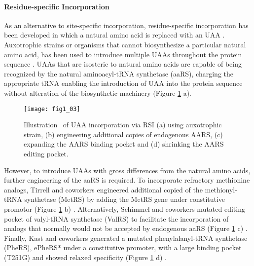 \begin{refsection}
\paragraph{ Residue-specific Incorporation}
As an alternative to site-specific incorporation, residue-specific
incorporation has been developed in which a natural amino acid is replaced with
an UAA \cite{Wang2001}. Auxotrophic strains or organisms that cannot
biosynthesize a particular natural amino acid, has been used to introduce
multiple UAAs throughout the protein sequence \cite{Wang2001,Johnson2010}. UAAs
that are isosteric to natural amino acids are capable of being recognized by
the natural aminoacyl-tRNA synthetase (aaRS), charging the appropriate tRNA
enabling the introduction of UAA into the protein sequence without alteration
of the biosynthetic machinery (Figure \ref{fig:rsi} a).
\begin{figure}[htbp] \centering \texttt{[image: fig1\_03]} 
    \caption[Illustration  of UAA incorporation via RSI (a) using auxotrophic
    strain, (b) engineering additional copies of endogenous AARS, (c) expanding
the AARS binding pocket and (d) shrinking the AARS editing
pocket.]{Illustration  of UAA incorporation via RSI (a) using auxotrophic
strain, (b) engineering additional copies of endogenous AARS, (c) expanding the
AARS binding pocket and (d) shrinking the AARS editing pocket.} 
\label{fig:rsi} 
\end{figure}

However, to introduce UAAs with gross differences from the natural amino acids,
further engineering of the aaRS is required. To incorporate refractory
methionine analogs, Tirrell and coworkers engineered additional copied of the
methionyl-tRNA synthetase (MetRS) by adding the MetRS gene under constitutive
promotor (Figure \ref{fig:rsi} b) \cite{Kiick2000}.  Alternatively, Schimmel
and coworkers mutated editing pocket of valyl-tRNA synthetase (ValRS) to
facilitate the incorporation of analogs that normally would not be accepted by
endogenous aaRS (Figure \ref{fig:rsi} c) \cite{Doring2001}.  Finally, Kast and
coworkers generated a mutated phenylalanyl-tRNA synthetase (PheRS), ePheRS*
under a constitutive promoter, with a large binding pocket (T251G) and showed
relaxed specificity (Figure \ref{fig:rsi} d) \cite{Kast1991}.


\end{refsection}

